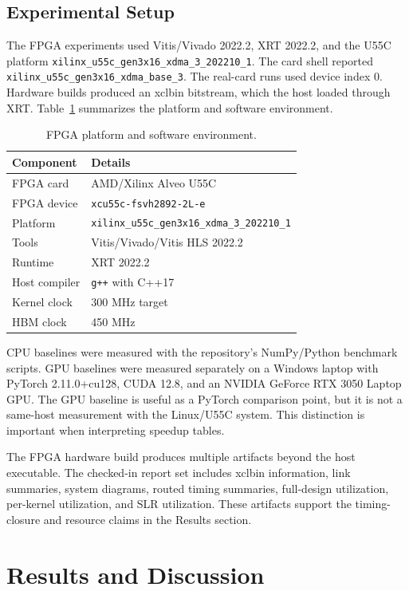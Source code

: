 \documentclass[conference]{IMSTemplate}
\begin{document}
\subsection{Experimental Setup}

The FPGA experiments used Vitis/Vivado 2022.2, XRT 2022.2, and the U55C
platform \texttt{xilinx\_u55c\_gen3x16\_xdma\_3\_202210\_1}. The card shell
reported \texttt{xilinx\_u55c\_gen3x16\_xdma\_base\_3}. The real-card runs used
device index 0. Hardware builds produced an xclbin bitstream, which the host
loaded through XRT. Table~\ref{tab:platform} summarizes the platform and
software environment.

\begin{table}[t]
\centering
\caption{FPGA platform and software environment.}
\label{tab:platform}
\begin{tabular}{ll}
\toprule
Component & Details \\
\midrule
FPGA card & AMD/Xilinx Alveo U55C \\
FPGA device & \texttt{xcu55c-fsvh2892-2L-e} \\
Platform & \texttt{xilinx\_u55c\_gen3x16\_xdma\_3\_202210\_1} \\
Tools & Vitis/Vivado/Vitis HLS 2022.2 \\
Runtime & XRT 2022.2 \\
Host compiler & \texttt{g++} with C++17 \\
Kernel clock & 300 MHz target \\
HBM clock & 450 MHz \\
\bottomrule
\end{tabular}
\end{table}

CPU baselines were measured with the repository's NumPy/Python benchmark
scripts. GPU baselines were measured separately on a Windows laptop with
PyTorch 2.11.0+cu128, CUDA 12.8, and an NVIDIA GeForce RTX 3050 Laptop GPU. The
GPU baseline is useful as a PyTorch comparison point, but it is not a
same-host measurement with the Linux/U55C system. This distinction is important
when interpreting speedup tables.

The FPGA hardware build produces multiple artifacts beyond the host executable.
The checked-in report set includes xclbin information, link summaries, system
diagrams, routed timing summaries, full-design utilization, per-kernel
utilization, and SLR utilization. These artifacts support the timing-closure
and resource claims in the Results section.

\section{Results and Discussion}
\end{document}
